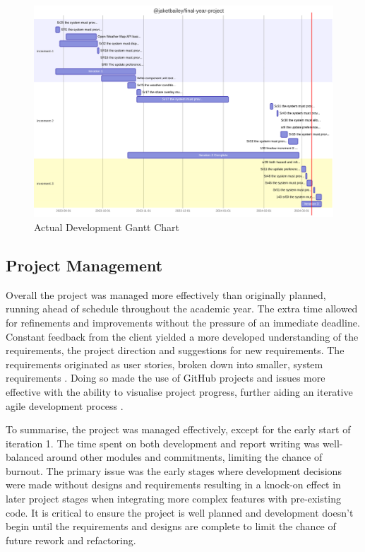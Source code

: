 \begin{figure}
    \centering
    \includegraphics[width=1\linewidth]{figures/dev-gantt.pdf}
    \caption{Actual Development Gantt Chart}
    \label{fig:development-gantt}
\end{figure}

\subsection{Project Management}
Overall the project was managed more effectively than originally planned, running ahead of schedule throughout the academic year. The extra time allowed for refinements and improvements without the pressure of an immediate deadline. Constant feedback from the client yielded a more developed understanding of the requirements, the project direction and suggestions for new requirements. The requirements originated as user stories, broken down into smaller, system requirements . Doing so made the use of GitHub projects  and issues more effective with the ability to visualise project progress, further aiding an iterative agile development process .

To summarise, the project was managed effectively, except for the early start of iteration 1. The time spent on both development and report writing was well-balanced around other modules and commitments, limiting the chance of burnout. The primary issue was the early stages where development decisions were made without designs and requirements resulting in a knock-on effect in later project stages when integrating more complex features with pre-existing code. It is critical to ensure the project is well planned and development doesn't begin until the requirements and designs are complete to limit the chance of future rework and refactoring.

